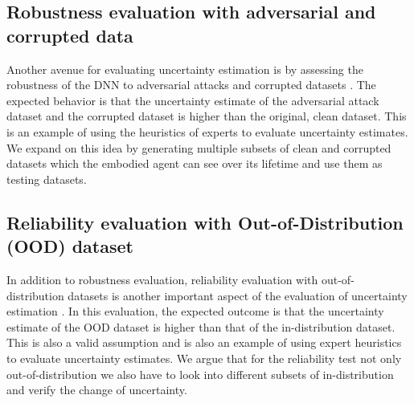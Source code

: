 \hypertarget{robustness-evaluation-with-adversarial-attack-and-corrupted-dataset}{%
\subsection{Robustness evaluation with adversarial and corrupted data}\label{robustness-evaluation-with-adversarial-attack-and-corrupted-dataset}}

Another avenue for evaluating uncertainty estimation is by assessing the
robustness of the DNN to adversarial attacks \cite{sensoy2018evidential} \cite{van2020uncertainty} \cite{liu2020simple}  and corrupted datasets  \cite{joppich2022classification} \cite{hendrycks2020augmix}. The expected behavior is that the
uncertainty estimate of the adversarial attack dataset and the corrupted
dataset is higher than the original, clean dataset. This is an example
of using the heuristics of experts to evaluate uncertainty estimates. We
expand on this idea by generating multiple subsets of clean and corrupted datasets
which the embodied agent can see over its lifetime and use them as
testing datasets.

\hypertarget{reliability-evaluation-with-ood-dataset}{%
\subsection{Reliability evaluation with Out-of-Distribution (OOD) dataset}\label{reliability-evaluation-with-ood-dataset}}

In addition to robustness evaluation, reliability evaluation with
out-of-distribution datasets is another important aspect of the
evaluation of uncertainty estimation \cite{sensoy2018evidential} \cite{kristiadi2021learnable} \cite{kristiadi2020being}. In
this evaluation, the expected outcome is that the uncertainty estimate
of the OOD dataset is higher than that of the in-distribution dataset.
This is also a valid assumption and is also an example of using expert
heuristics to evaluate uncertainty estimates. We argue that for the
reliability test not only out-of-distribution we also have to look into
different subsets of in-distribution and verify the change of
uncertainty.


